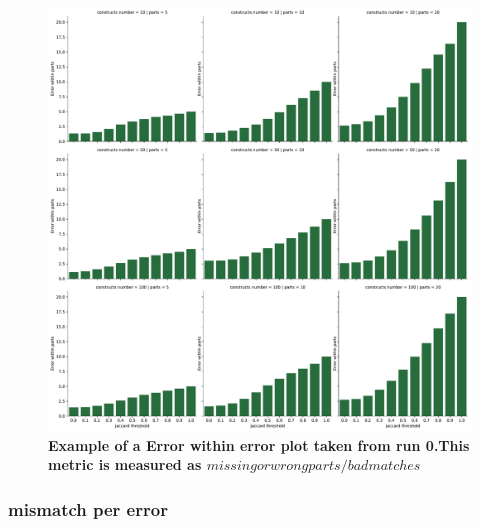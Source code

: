 \documentclass[11pt, a4paper]{article}
\begin{document}
\begin{figure}[ht]
    \begin{center}
    \includegraphics[width=1\textwidth]{../results/images_notebook/v_310/001_error_per_error.pdf}
    \end{center}
    \caption{{\bf Example of a Error within error plot taken from run 0.This metric is measured as $missing or wrong parts/bad matches$ }}
   \label{fig:v_310_error_within_error}
\end{figure}


\subsubsection{mismatch per error }
\end{document}
